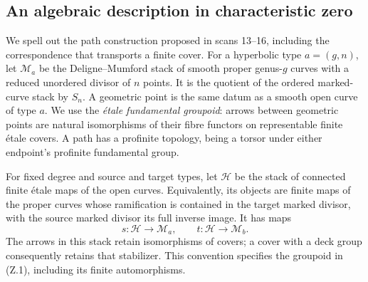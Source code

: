 \subsection{An algebraic description in characteristic zero}
We spell out the path construction proposed in scans 13--16, including
the correspondence that transports a finite cover. For a hyperbolic
type $a=(g,n)$, let $\mathcal M_a$ be the Deligne--Mumford stack of
smooth proper genus-$g$ curves with a reduced unordered divisor of
$n$ points. It is the quotient of the ordered marked-curve stack by
$S_n$. A geometric point is the same datum as a smooth open curve of
type $a$. We use the \emph{\'etale fundamental groupoid}: arrows between
geometric points are natural isomorphisms of their fibre functors on
representable finite \'etale covers. A path has a profinite topology,
being a torsor under either endpoint's profinite fundamental group.

For fixed degree and source and target types, let $\mathcal H$ be the
stack of connected finite \'etale maps of the open curves. Equivalently,
its objects are finite maps of the proper curves whose ramification is
contained in the target marked divisor, with the source marked divisor
its full inverse image. It has maps
\[
       s:\mathcal H\longrightarrow\mathcal M_a,
       \qquad t:\mathcal H\longrightarrow\mathcal M_b .       \tag{Z.1}
\]
The arrows in this stack retain isomorphisms of covers; a cover with
a deck group consequently retains that stabilizer. This convention
specifies the groupoid in (Z.1), including its finite automorphisms.

